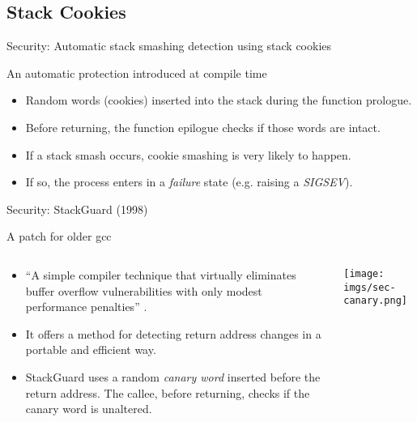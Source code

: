 \subsection{Stack Cookies}
\begin{frame}{Security: Automatic stack smashing detection using stack cookies}
	\begin{block}{An automatic protection introduced at compile time}
	\begin{itemize}
		\item Random words (cookies) inserted into the stack during the function prologue.
		\item Before returning, the function epilogue checks if those words are intact.
		\item If a stack smash occurs, cookie smashing is very likely to happen.
		\item If so, the process enters in a \emph{failure} state (e.g. raising a \emph{SIGSEV}).
	\end{itemize}
	\end{block}
\end{frame}

\begin{frame}{Security: StackGuard (1998)}
	\begin{block}{A patch for older gcc}
		\begin{columns}
			\begin{column}{.6\textwidth}
				\begin{itemize}
					\item ``A simple compiler technique that virtually eliminates buffer
						overflow vulnerabilities with only modest performance penalties''
						\cite{stackguard}.
					\item It offers a method for detecting return address changes in a
						portable and efficient way.
					\item StackGuard uses a random \emph{canary word} inserted before
						the return address. The callee, before returning, checks if the canary
						word is unaltered.
				\end{itemize}
			\end{column}
			\begin{column}{.4\textwidth}
				\texttt{[image: imgs/sec-canary.png]}
			\end{column}
		\end{columns}
	\end{block}
\end{frame}

